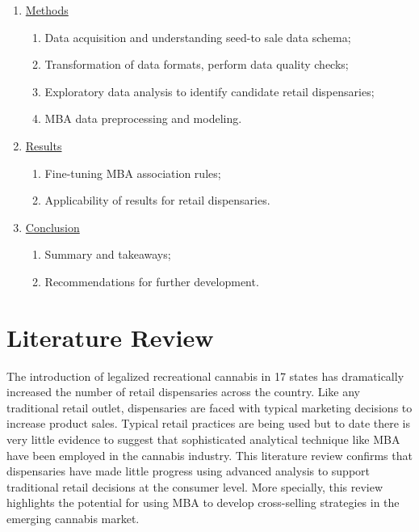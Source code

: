 \documentclass[../article.tex, 12pt]{subfiles}
\begin{document}
\begin{multicols*}{2}
{\begin{enumerate}
\item \hyperref[sec:methodology]{Methods}

\begin{enumerate}
\item Data acquisition and understanding seed-to sale data schema;
\item Transformation of data formats, perform data quality checks;
\item Exploratory data analysis to identify candidate retail dispensaries;
\item MBA data preprocessing and modeling.
\end{enumerate}

\item \hyperref[sec:results-and-discussion]{Results}

\begin{enumerate}
\item Fine-tuning MBA association rules;
\item Applicability of results for retail dispensaries.

\end{enumerate}

\item \hyperref[sec:conclusion]{Conclusion}

\begin{enumerate}
\item Summary and takeaways;
\item Recommendations for further development.
\end{enumerate}

\end{enumerate}
}

\section{Literature Review}
\label{sec:literature-review}

The introduction of legalized recreational cannabis in 17 states has dramatically increased the number of retail dispensaries across the country. Like any traditional retail outlet, dispensaries are faced with typical marketing decisions to increase product sales. Typical retail practices are being used but to date there is very little evidence to suggest that sophisticated analytical technique like MBA have been employed in the cannabis industry. This literature review confirms that dispensaries have made little progress using advanced analysis to support traditional retail decisions at the consumer level. More specially, this review highlights the potential for using MBA to develop cross-selling strategies in the emerging cannabis market.


\end{multicols*}
\end{document}
